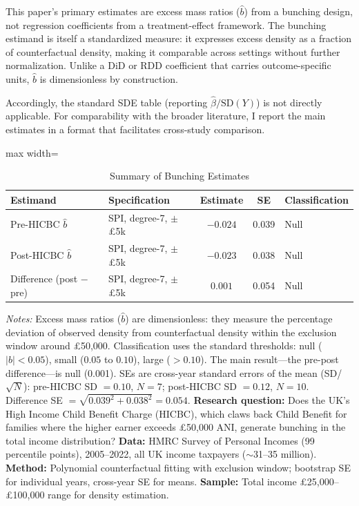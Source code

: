 \documentclass[12pt]{article}
\newcommand{\bhat}{\hat{b}}
\begin{document}
This paper's primary estimates are excess mass ratios ($\bhat$) from a bunching design, not regression coefficients from a treatment-effect framework. The bunching estimand is itself a standardized measure: it expresses excess density as a fraction of counterfactual density, making it comparable across settings without further normalization. Unlike a DiD or RDD coefficient that carries outcome-specific units, $\bhat$ is dimensionless by construction.

Accordingly, the standard SDE table (reporting $\hat{\beta} / \text{SD}(Y)$) is not directly applicable. For comparability with the broader literature, I report the main estimates in a format that facilitates cross-study comparison.

\begin{table}[H]
\centering
\caption{Summary of Bunching Estimates}
\label{tab:sde}
\begin{adjustbox}{max width=\textwidth}
\begin{tabular}{llccl}
\toprule
Estimand & Specification & Estimate & SE & Classification \\
\midrule
Pre-HICBC $\bhat$ & SPI, degree-7, $\pm$\pounds5k & $-0.024$ & 0.039 & Null \\
Post-HICBC $\bhat$ & SPI, degree-7, $\pm$\pounds5k & $-0.023$ & 0.038 & Null \\
Difference (post $-$ pre) & SPI, degree-7, $\pm$\pounds5k & $0.001$ & 0.054 & Null \\
\bottomrule
\end{tabular}
\end{adjustbox}
\par\vspace{0.3em}
{\footnotesize \emph{Notes:} Excess mass ratios ($\bhat$) are dimensionless: they measure the percentage deviation of observed density from counterfactual density within the exclusion window around \pounds50,000. Classification uses the standard thresholds: null ($|b| < 0.05$), small ($0.05$ to $0.10$), large ($> 0.10$). The main result---the pre-post difference---is null (0.001). SEs are cross-year standard errors of the mean (SD/$\sqrt{N}$): pre-HICBC SD $= 0.10$, $N=7$; post-HICBC SD $= 0.12$, $N=10$. Difference SE $= \sqrt{0.039^2 + 0.038^2} = 0.054$. \textbf{Research question:} Does the UK's High Income Child Benefit Charge (HICBC), which claws back Child Benefit for families where the higher earner exceeds \pounds50,000 ANI, generate bunching in the total income distribution? \textbf{Data:} HMRC Survey of Personal Incomes (99 percentile points), 2005--2022, all UK income taxpayers ($\sim$31--35 million). \textbf{Method:} Polynomial counterfactual fitting with exclusion window; bootstrap SE for individual years, cross-year SE for means. \textbf{Sample:} Total income \pounds25,000--\pounds100,000 range for density estimation.}
\end{table}
\end{document}
